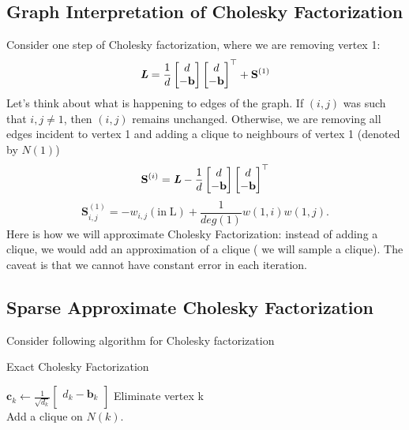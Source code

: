 \documentclass[11pt]{article}
\renewcommand{\tr}[1]{\ensuremath{{#1}}^{\top}}
\begin{document}
\subsection{Graph Interpretation of Cholesky Factorization}
Consider one step of Cholesky factorization, where we are removing vertex 1:
\[\LL = \frac {1}{d} \left[
\begin{matrix}
d \\
{-\mathbf{b}}\\
\end{matrix}
\right]
\tr {
\left[
\begin{matrix}
d \\
 {-\mathbf{b}}\\
\end{matrix}
\right]} + \mathbf{S}^{(1)}\]
Let's think about what is happening to edges of the graph. \newline
If $(i, j)$ was such that $i,j \ne 1$, then $(i, j)$ remains unchanged.
Otherwise, we are removing all edges incident to vertex 1 and adding a clique to neighbours of vertex 1 (denoted by $N(1)$)
\[\mathbf{S}^{(i)} = \LL -\frac {1}{d} \left[
\begin{matrix}
d \\
{-\mathbf{b}}\\
\end{matrix}
\right]
\tr {
\left[
\begin{matrix}
d \\
 {-\mathbf{b}}\\
\end{matrix}
\right]}\]
\[\mathbf{S}^{(1)}_{i,j} =  - w_{i,j} (\mathrm{in\; L}) + \frac {1}{deg(1)} w(1,i)w(1,j).\]
Here is how we will approximate Cholesky Factorization: instead of adding a clique, we would add an approximation of a clique ( we will sample a clique). The caveat is that we cannot have constant error in each iteration. 

\subsection{Sparse Approximate Cholesky Factorization}
Consider following algorithm for Cholesky factorization
\begin{algorithm}[H]
\caption{Exact Cholesky Factorization}
\begin{algorithmic}[1]
	 \State $\mathbf{c}_k \gets \frac {1}{\sqrt{d_k}}\left[\begin{matrix}d_k 
-\mathbf{b}_k\\ 
\end{matrix}\right]$ 
	\State Eliminate vertex k\\
	\State Add a clique on $N(k)$.
\EndFor
\end{algorithmic}
\end{algorithm}
\end{document}
